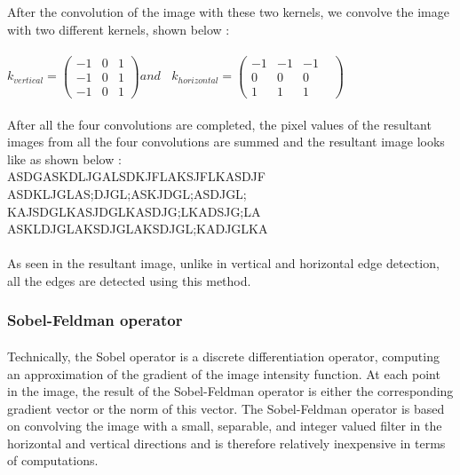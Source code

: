 \documentclass{article}
\begin{document}
		After the convolution of the image with these two kernels, we convolve the image with two different kernels, shown below : \\ \\
		$k_{vertical} = 
		\left(
		\begin{matrix}
		-1 & 0 & 1 \\
		-1 & 0 & 1 \\
		-1 & 0 & 1
		\end{matrix}
		\right) 
		and\ \ \ \ 
		k_{horizontal} = 
		\left(
		\begin{matrix}
		-1&  -1&  -1& \\
		 0&   0&   0& \\
		 1&   1&   1&
		\end{matrix}
		\right)
		$

		\paragraph{}
		After all the four convolutions are completed, the pixel values of the resultant images from all the four convolutions are summed and the resultant image looks like as shown below : \\


			ASDGASKDLJGALSDKJFLAKSJFLKASDJF\\
			ASDKLJGLAS;DJGL;ASKJDGL;ASDJGL;\\
			KAJSDGLKASJDGLKASDJG;LKADSJG;LA\\
			ASKLDJGLAKSDJGLAKSDJGL;KADJGLKA\\

		\paragraph{}
		As seen in the resultant image, unlike in vertical and horizontal edge detection, all the edges are detected using this method.

		\subsubsection{Sobel-Feldman operator}
		\paragraph{}
		Technically, the Sobel operator is a discrete differentiation operator, computing an approximation of the gradient of the image intensity function. At each point in the image, the result of the Sobel-Feldman operator is either the corresponding gradient vector or the norm of this vector. The Sobel-Feldman operator is based on convolving the image with a small, separable, and integer valued filter in the horizontal and vertical directions and is therefore relatively inexpensive in terms of computations.
\end{document}
